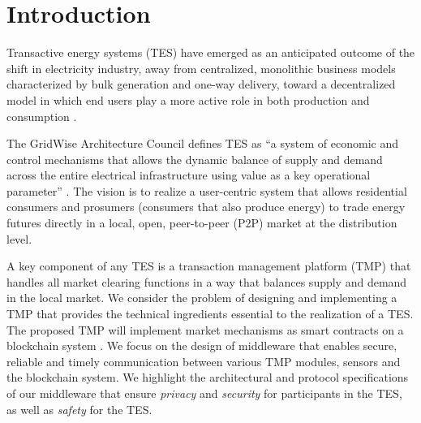 \documentclass[sigplan]{acmart}
\newcommand{\Abhishek}[1]{\todo[color=yellow!50, linecolor=black!50]{\textbf{Abhishek}: #1}}
\newcommand{\Karla}[1]{\todo[color=green!50, linecolor=black!50]{\textbf{Karla}: #1}}
\begin{document}
\maketitle

\section{Introduction}

Transactive energy systems (TES) have emerged as an anticipated outcome of the shift in electricity industry, away from centralized, monolithic business models characterized by bulk generation and one-way delivery, toward a decentralized model in which end users play a more active role in both production and consumption \cite{NIST_TE}. %

The GridWise Architecture Council defines TES as ``a system of economic and control mechanisms that allows the dynamic balance of supply and demand across the entire electrical infrastructure using value as a key operational parameter'' \cite{Gridwise}. The vision is to realize a user-centric system that allows residential consumers and prosumers (consumers that also produce energy) to trade energy futures directly in a local, open, peer-to-peer (P2P) market at the distribution level. 

A key component of any TES is a transaction management platform (TMP) that handles all market clearing functions in a way that balances supply and demand in the local market. We consider the problem of designing and implementing a TMP that provides the technical ingredients essential to the realization of a TES. The proposed TMP will implement market mechanisms as smart contracts on a blockchain system \cite{MasteringBlockchain}. We focus on the design of middleware that enables secure, reliable and timely communication between various TMP modules, sensors and the blockchain system. We highlight the architectural and protocol specifications of our middleware that ensure \emph{privacy} and \emph{security} for participants in the TES, as well as \emph{safety} for the TES. 
\end{document}

